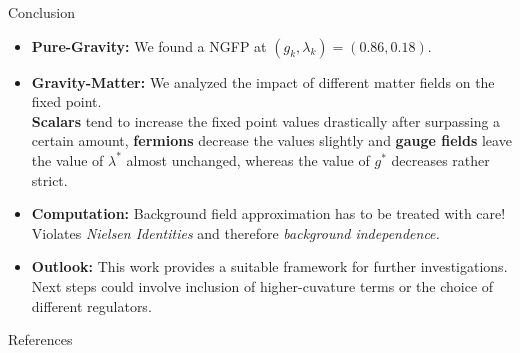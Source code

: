 \documentclass{beamer}
\begin{document}
\begin{frame}{Conclusion}
\begin{itemize}
	\item \textbf{Pure-Gravity:} We found a NGFP at $(g_k, \lambda_k)=(0.86, 0.18)$.\vspace{0.3cm}
	\item \textbf{Gravity-Matter:} We analyzed the impact of different matter fields on the fixed point. \\\textbf{Scalars} tend to increase the fixed point values drastically after surpassing a certain amount, \textbf{fermions} decrease the values slightly and \textbf{gauge fields} leave the value of $\lambda^*$ almost unchanged, whereas the value of $g^*$ decreases rather strict.\vspace{0.3cm}
	\item \textbf{Computation:} Background field approximation has to be treated with care! Violates \textit{Nielsen Identities} and therefore \textit{background independence.}\vspace{0.3cm}
	\item \textbf{Outlook:} This work provides a suitable framework for further investigations. Next steps could involve inclusion of higher-cuvature terms or the choice of different regulators. 
\end{itemize}	
\end{frame}

\begin{frame}[shrink=20]{References}

\nocite{*}
\printbibliography

\end{frame}
\end{document}
